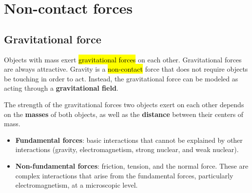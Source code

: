 \chapter{Non-contact forces}

\section{Gravitational force}

Objects with mass exert \hl{gravitational forces} on each other. Gravitational forces are always attractive. Gravity is a \hl{non-contact} force that does not require objects be touching in order to act. Instead, the gravitational force can be modeled as acting through a \textbf{gravitational field}.

The strength of the gravitational forces two objects exert on each other depends on the \textbf{masses} of both objects, as well as the \textbf{distance} between their centers of mass.

\begin{itemize}
  \item \textbf{Fundamental forces}: basic interactions that cannot be explained by other interactions (gravity, electromagnetism, strong nuclear, and weak nuclear).
  \item \textbf{Non-fundamental forces}: friction, tension, and the normal force. These are complex interactions that arise from the fundamental forces, particularly electromagnetism, at a microscopic level.
\end{itemize}
